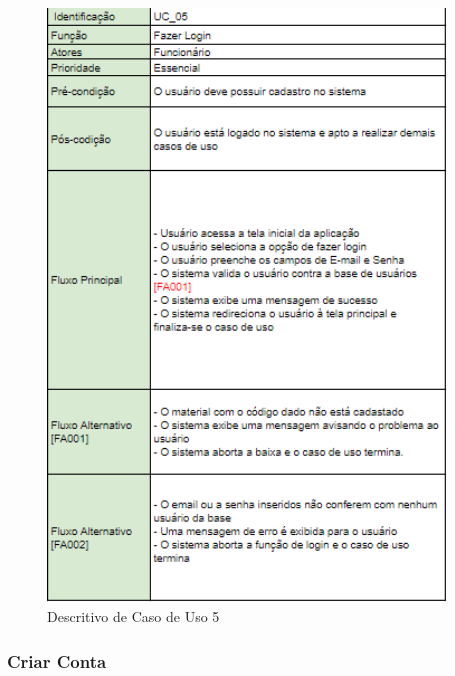 \documentclass[rascunho,xindy,acronym,symbols]{fei}
\begin{document}
\begin{figure}[H]
    \centering
    \includegraphics[scale=0.6, width=300pt]{./Images/Descritivos/UC5.png}
    \caption{Descritivo de Caso de Uso 5}
     \label{fig:desc_uc5}
\end{figure}

\subsubsection{Criar Conta}
\end{document}
